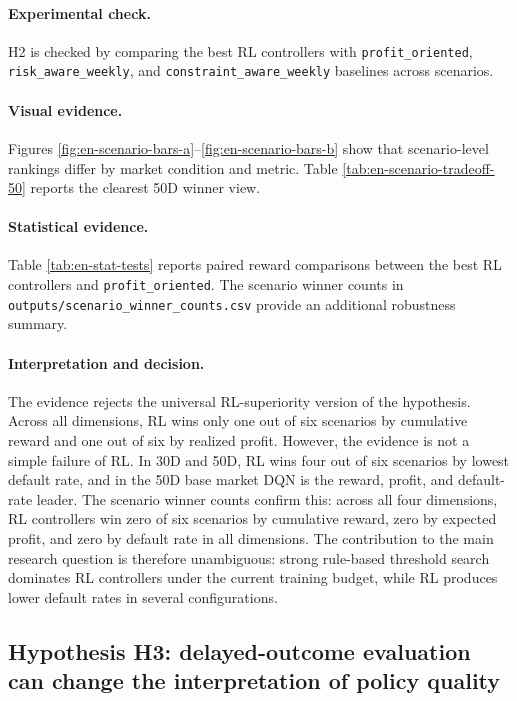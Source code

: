 \documentclass[12pt,a4paper]{article}
\begin{document}
\paragraph{Experimental check.}
H2 is checked by comparing the best RL controllers with \texttt{profit\_oriented}, \texttt{risk\_aware\_weekly}, and \texttt{constraint\_aware\_weekly} baselines across scenarios.

\paragraph{Visual evidence.}
Figures \ref{fig:en-scenario-bars-a}--\ref{fig:en-scenario-bars-b} show that scenario-level rankings differ by market condition and metric. Table \ref{tab:en-scenario-tradeoff-50} reports the clearest 50D winner view.

\paragraph{Statistical evidence.}
Table \ref{tab:en-stat-tests} reports paired reward comparisons between the best RL controllers and \texttt{profit\_oriented}. The scenario winner counts in \texttt{outputs/scenario\_winner\_counts.csv} provide an additional robustness summary.

\paragraph{Interpretation and decision.}
The evidence rejects the universal RL-superiority version of the hypothesis. Across all dimensions, RL wins only one out of six scenarios by cumulative reward and one out of six by realized profit. However, the evidence is not a simple failure of RL. In 30D and 50D, RL wins four out of six scenarios by lowest default rate, and in the 50D base market DQN is the reward, profit, and default-rate leader. The scenario winner counts confirm this: across all four dimensions, RL controllers win zero of six scenarios by cumulative reward, zero by expected profit, and zero by default rate in all dimensions. The contribution to the main research question is therefore unambiguous: strong rule-based threshold search dominates RL controllers under the current training budget, while RL produces lower default rates in several configurations.

\subsection{Hypothesis H3: delayed-outcome evaluation can change the interpretation of policy quality}
\end{document}
